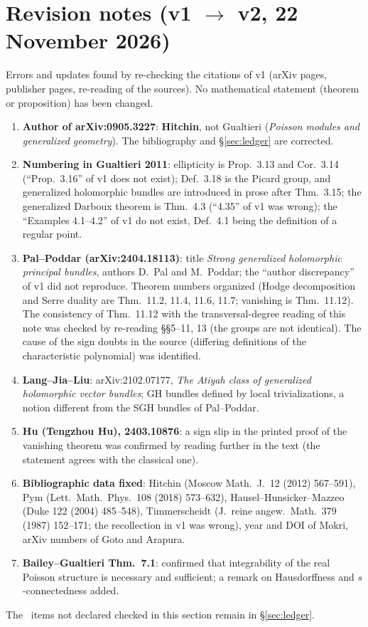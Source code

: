 \section{Revision notes (v1 $\to$ v2, 22 November 2026)}\label{sec:rev}
Errors and updates found by re-checking the citations of v1 (arXiv pages, publisher pages, re-reading of the sources). No mathematical statement (theorem or proposition) has been changed.
\begin{enumerate}
\item \textbf{Author of arXiv:0905.3227}: \textbf{Hitchin}, not Gualtieri (\emph{Poisson modules and generalized geometry}). The bibliography and \S\ref{sec:ledger} are corrected.
\item \textbf{Numbering in Gualtieri 2011}: ellipticity is Prop.~3.13 and Cor.~3.14 (``Prop.~3.16'' of v1 does not exist); Def.~3.18 is the Picard group, and generalized holomorphic bundles are introduced in prose after Thm.~3.15; the generalized Darboux theorem is Thm.~4.3 (``4.35'' of v1 was wrong); the ``Examples 4.1--4.2'' of v1 do not exist, Def.~4.1 being the definition of a regular point.
\item \textbf{Pal--Poddar (arXiv:2404.18113)}: title \emph{Strong generalized holomorphic principal bundles}, authors D.~Pal and M.~Poddar; the ``author discrepancy'' of v1 did not reproduce. Theorem numbers organized (Hodge decomposition and Serre duality are Thm.~11.2, 11.4, 11.6, 11.7; vanishing is Thm.~11.12). The consistency of Thm.~11.12 with the transversal-degree reading of this note was checked by re-reading \S\S5--11, 13 (the groups are not identical). The cause of the sign doubts in the source (differing definitions of the characteristic polynomial) was identified.
\item \textbf{Lang--Jia--Liu}: arXiv:2102.07177, \emph{The Atiyah class of generalized holomorphic vector bundles}; GH bundles defined by local trivializations, a notion different from the SGH bundles of Pal--Poddar.
\item \textbf{Hu (Tengzhou Hu), 2403.10876}: a sign slip in the printed proof of the vanishing theorem was confirmed by reading further in the text (the statement agrees with the classical one).
\item \textbf{Bibliographic data fixed}: Hitchin (Moscow Math.\ J.\ 12 (2012) 567--591), Pym (Lett.\ Math.\ Phys.\ 108 (2018) 573--632), Hausel--Hunsicker--Mazzeo (Duke 122 (2004) 485--548), Timmerscheidt (J.\ reine angew.\ Math.\ 379 (1987) 152--171; the recollection in v1 was wrong), year and DOI of Mokri, arXiv numbers of Goto and Arapura.
\item \textbf{Bailey--Gualtieri Thm.~7.1}: confirmed that integrability of the real Poisson structure is necessary and sufficient; a remark on Hausdorffness and $s$-connectedness added.
\end{enumerate}
The \tQ\ items not declared checked in this section remain in \S\ref{sec:ledger}.


